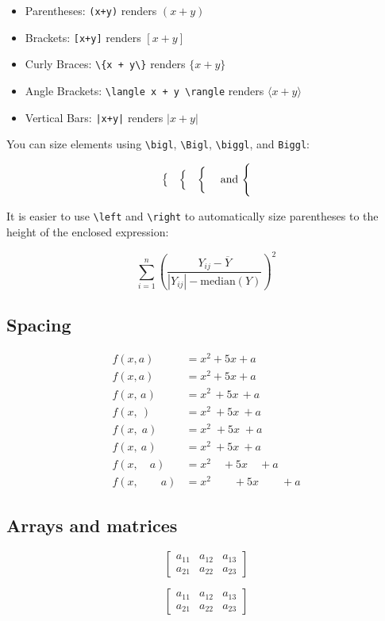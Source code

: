 \documentclass[11pt,oneside, letterpaper]{article}
\begin{document}
\begin{itemize}
	\item Parentheses: \verb|(x+y)| renders $(x+y)$
	\item Brackets: \verb|[x+y]| renders $[x+y]$
	\item Curly Braces: \verb|\{x + y\}| renders $\{x + y\}$
	\item Angle Brackets: \verb|\langle x + y \rangle| renders $\langle x + y \rangle$
	\item Vertical Bars: \texttt{|x+y|} renders $|x + y|$
\end{itemize}

You can size elements using \verb|\bigl|, \verb|\Bigl|, \verb|\biggl|, and \verb|Biggl|:

$$
\bigl\{ \quad \Bigl\{ \quad \biggl\{ \quad \text{ and } \Biggl\{
$$

It is easier to use \verb|\left| and \verb|\right| to automatically size parentheses to the height of the enclosed expression:

$$
\sum_{i=1}^n \left( \frac{Y_{ij} - \overline{Y}} {\left|Y_{ij}\right| - \text{median}(Y)} \right )^2
$$

\subsection{Spacing}

\begin{align*}
f(x,\!a) &= x^2\! +5x\! +a \\
f(x,a) &= x^2+5x+a \\
f(x,\,a) &= x^2\, +5x\, +a \\
f(x,\:) &= x^2\: +5x\: +a \\
f(x,\;a) &= x^2\; +5x\; +a \\
f(x,\ a) &= x^2\ +5x\ +a \\
f(x,\quad a) &= x^2\quad +5x\quad +a \\
f(x,\qquad a) &= x^2\qquad +5x\qquad +a
\end{align*}

\subsection{Arrays and matrices}

$$
\begin{bmatrix}
   a_{11} & a_{12} & a_{13} \\
   a_{21} & a_{22} & a_{23}
\end{bmatrix}
$$

$$
\left [
\begin{array}{ccc}
   a_{11} & a_{12} & a_{13} \\
   a_{21} & a_{22} & a_{23}
\end{array}
\right ]
$$
\end{document}
